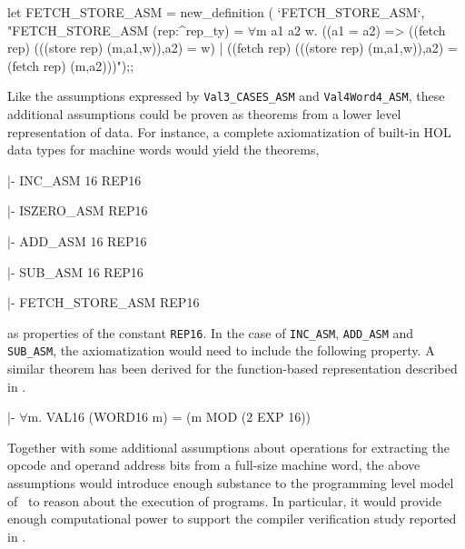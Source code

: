let FETCH_STORE_ASM = new_definition (
  `FETCH_STORE_ASM`,
  "FETCH_STORE_ASM (rep:^rep_ty) =
    \(\forall\)m a1 a2 w.
      ((a1 = a2) =>
        ((fetch rep) (((store rep) (m,a1,w)),a2) = w) |
        ((fetch rep) (((store rep) (m,a1,w)),a2) = (fetch rep) (m,a2)))");;
\endtt

Like the assumptions expressed by \verb"Val3_CASES_ASM"
and \verb"Val4Word4_ASM",
these additional assumptions could be proven as theorems
from a lower level representation of data.
For instance, a complete axiomatization
of built-in HOL data types for machine words
would yield the theorems,

\begintt
|- INC_ASM 16 REP16

|- ISZERO_ASM REP16

|- ADD_ASM 16 REP16

|- SUB_ASM 16 REP16

|- FETCH_STORE_ASM REP16
\endtt

\noindent
as properties of the constant \verb"REP16".
In the case of \verb"INC_ASM", \verb"ADD_ASM" and \verb"SUB_ASM",
the axiomatization would need to include the following property.
A similar theorem has been derived for the function-based
representation described in \cite{Joyce:glasgow,Joyce:pisa}.

\begintt
|- \(\forall\)m. VAL16 (WORD16 m) = (m MOD (2 EXP 16))
\endtt

Together with some additional assumptions about operations
for extracting the opcode and operand address bits from
a full-size machine word,
the above assumptions
would introduce enough substance to the programming level model
of \Tamarack\ to reason about the execution of programs.
In particular, it would provide enough computational power to support
the compiler verification study reported
in \cite{Joyce:tech167,Joyce:cornell}.
